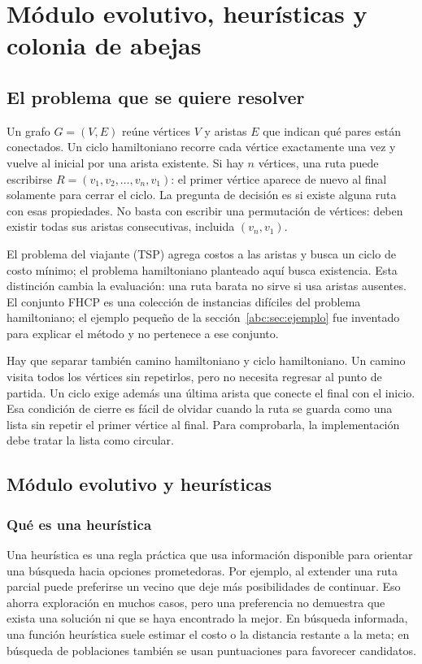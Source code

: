 \chapter{Módulo evolutivo, heurísticas y colonia de abejas}
\section{El problema que se quiere resolver}
Un grafo $G=(V,E)$ reúne vértices $V$ y aristas $E$ que indican qué pares están conectados. Un ciclo hamiltoniano recorre cada vértice exactamente una vez y vuelve al inicial por una arista existente. Si hay $n$ vértices, una ruta puede escribirse $R=(v_1,v_2,\ldots,v_n,v_1)$: el primer vértice aparece de nuevo al final solamente para cerrar el ciclo. La pregunta de decisión es si existe alguna ruta con esas propiedades.\cite{abc1} No basta con escribir una permutación de vértices: deben existir todas sus aristas consecutivas, incluida $(v_n,v_1)$.

El problema del viajante (TSP) agrega costos a las aristas y busca un ciclo de costo mínimo; el problema hamiltoniano planteado aquí busca existencia. Esta distinción cambia la evaluación: una ruta barata no sirve si usa aristas ausentes. El conjunto FHCP es una colección de instancias difíciles del problema hamiltoniano; el ejemplo pequeño de la sección~\ref{abc:sec:ejemplo} fue inventado para explicar el método y no pertenece a ese conjunto.\cite{abc2}

Hay que separar también camino hamiltoniano y ciclo hamiltoniano. Un camino visita todos los vértices sin repetirlos, pero no necesita regresar al punto de partida. Un ciclo exige además una última arista que conecte el final con el inicio. Esa condición de cierre es fácil de olvidar cuando la ruta se guarda como una lista sin repetir el primer vértice al final. Para comprobarla, la implementación debe tratar la lista como circular.

\section{Módulo evolutivo y heurísticas}
\subsection{Qué es una heurística}
Una heurística es una regla práctica que usa información disponible para orientar una búsqueda hacia opciones prometedoras. Por ejemplo, al extender una ruta parcial puede preferirse un vecino que deje más posibilidades de continuar. Eso ahorra exploración en muchos casos, pero una preferencia no demuestra que exista una solución ni que se haya encontrado la mejor. En búsqueda informada, una función heurística suele estimar el costo o la distancia restante a la meta; en búsqueda de poblaciones también se usan puntuaciones para favorecer candidatos.\cite{abc3}

